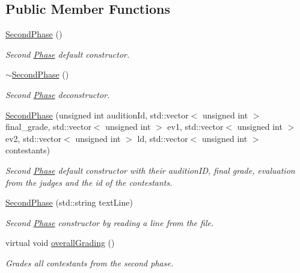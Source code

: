 \subsection*{Public Member Functions}
\begin{DoxyCompactItemize}
\item 
\mbox{\label{class_second_phase_ae8acf3524c58a688b2ef939d33c0cb77}} 
\hyperlink{class_second_phase_ae8acf3524c58a688b2ef939d33c0cb77}{Second\+Phase} ()
\begin{DoxyCompactList}\small\item\em Second \hyperlink{class_phase}{Phase} default constructor. \end{DoxyCompactList}\item 
\mbox{\label{class_second_phase_aa5277652125f6700334abd7619b8f9e6}} 
\hyperlink{class_second_phase_aa5277652125f6700334abd7619b8f9e6}{$\sim$\+Second\+Phase} ()
\begin{DoxyCompactList}\small\item\em Second \hyperlink{class_phase}{Phase} deconstructor. \end{DoxyCompactList}\item 
\hyperlink{class_second_phase_ac22a81240fb312f9ecdb1d8edb72ea9d}{Second\+Phase} (unsigned int audition\+Id, std\+::vector$<$ unsigned int $>$ final\+\_\+grade, std\+::vector$<$ unsigned int $>$ ev1, std\+::vector$<$ unsigned int $>$ ev2, std\+::vector$<$ unsigned int $>$ ld, std\+::vector$<$ unsigned int $>$ contestants)
\begin{DoxyCompactList}\small\item\em Second \hyperlink{class_phase}{Phase} default constructor with their audition\+ID, final grade, evaluation from the judges and the id of the contestants. \end{DoxyCompactList}\item 
\hyperlink{class_second_phase_ac65ce65f9908610e35fee1635be6d8af}{Second\+Phase} (std\+::string text\+Line)
\begin{DoxyCompactList}\small\item\em Second \hyperlink{class_phase}{Phase} constructor by reading a line from the file. \end{DoxyCompactList}\item 
\mbox{\label{class_second_phase_a54ab71dc4d4d6ffb38792767eeded188}} 
virtual void \hyperlink{class_second_phase_a54ab71dc4d4d6ffb38792767eeded188}{overall\+Grading} ()
\begin{DoxyCompactList}\small\item\em Grades all contestants from the second phase. \end{DoxyCompactList}\end{DoxyCompactItemize}
